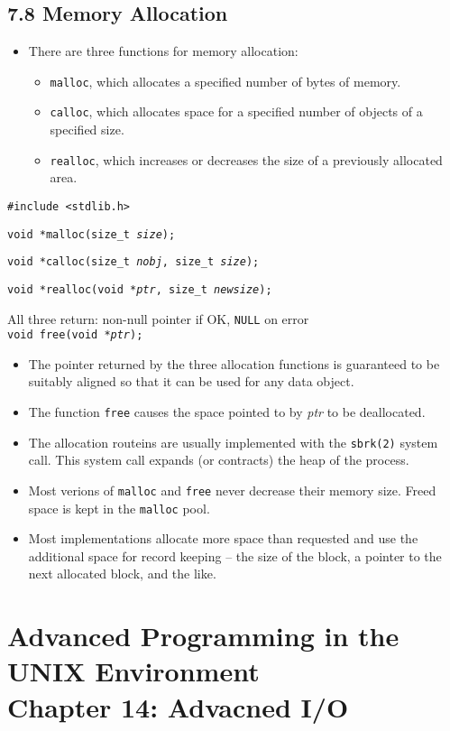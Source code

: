 \documentclass[]{article}
\newcommand{\code}{\texttt}
\begin{document}
\subsection*{7.8 Memory Allocation}
\begin{itemize}
\item There are three functions for memory allocation:
\begin{itemize}
\item \code{malloc}, which allocates a specified number of bytes of memory.
\item \code{calloc}, which allocates space for a specified number of objects of
a specified size.
\item \code{realloc}, which increases or decreases the size of a previously
allocated area.
\end{itemize}
\end{itemize}

\code{\#include <stdlib.h>}

\code{void *malloc(size\_t \emph{size});}

\code{void *calloc(size\_t \emph{nobj}, size\_t \emph{size});}

\code{void *realloc(void *\emph{ptr}, size\_t \emph{newsize});}

All three return: non-null pointer if OK, \code{NULL} on error \\

\code{void free(void *\emph{ptr});}

\begin{itemize}
\item The pointer returned by the three allocation functions is guaranteed to be
suitably aligned so that it can be used for any data object.
\item The function \code{free} causes the space pointed to by \emph{ptr} to be
deallocated.
\item The allocation routeins are usually implemented with the \code{sbrk(2)}
system call. This system call expands (or contracts) the heap of the process.
\item Most verions of \code{malloc} and \code{free} never decrease their memory
size. Freed space is kept in the \code{malloc} pool.
\item Most implementations allocate more space than requested and use the
additional space for record keeping -- the size of the block, a pointer to the
next allocated block, and the like.
\end{itemize}

\section*{Advanced Programming in the UNIX Environment \\
Chapter 14: Advacned I/O}
\end{document}

